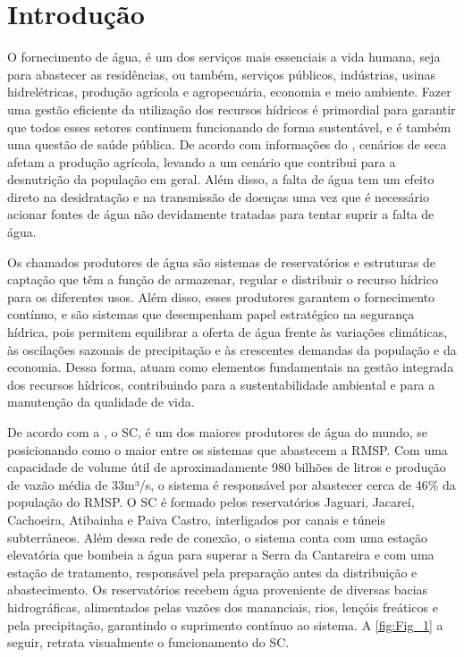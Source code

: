 \chapter{Introdução}

O fornecimento de água, é um dos serviços mais essenciais a vida humana, seja para abastecer as residências, ou também, serviços públicos, indústrias, usinas hidrelétricas, produção agrícola e agropecuária, economia e meio ambiente. Fazer uma gestão eficiente da utilização dos recursos hídricos é primordial para garantir que todos esses setores continuem funcionando de forma sustentável, e é também uma questão de saúde pública. De acordo com informações do \textcite{MS_Secas}, cenários de seca afetam a produção agrícola, levando a um cenário que contribui para a desnutrição da população em geral. Além disso, a falta de água tem um efeito direto na desidratação e na transmissão de doenças uma vez que é necessário acionar fontes de água não devidamente tratadas para tentar suprir a falta de água.   

Os chamados produtores de água são sistemas de reservatórios e estruturas de captação que têm a função de armazenar, regular e distribuir o recurso hídrico para os diferentes usos. Além disso, esses produtores garantem o fornecimento contínuo, e são sistemas que desempenham papel estratégico na segurança hídrica, pois permitem equilibrar a oferta de água frente às variações climáticas, às oscilações sazonais de precipitação e às crescentes demandas da população e da economia. Dessa forma, atuam como elementos fundamentais na gestão integrada dos recursos hídricos, contribuindo para a sustentabilidade ambiental e para a manutenção da qualidade de vida. 

De acordo com a \textcite{ANA_Cantareira}, o \acrfull{SC}, é um dos maiores produtores de água do mundo, se posicionando como o maior entre os sistemas que abastecem a \acrfull{RMSP}. Com uma capacidade de volume útil de aproximadamente 980 bilhões de litros e produção de vazão média de 33m³/s, o sistema é responsável por abastecer cerca de 46\% da população do \acrshort{RMSP}.  O \acrshort{SC} é formado pelos reservatórios Jaguari, Jacareí, Cachoeira, Atibainha e Paiva Castro, interligados por canais e túneis subterrâneos. Além dessa rede de conexão, o sistema conta com uma estação elevatória que bombeia a água para superar a Serra da Cantareira e com uma estação de tratamento, responsável pela preparação antes da distribuição e abastecimento. Os reservatórios recebem água proveniente de diversas bacias hidrográficas, alimentados pelas vazões dos mananciais, rios, lençóis freáticos e pela precipitação, garantindo o suprimento contínuo ao sistema. A \autoref{fig:Fig_1} a seguir, retrata visualmente o funcionamento do \acrshort{SC}. 

